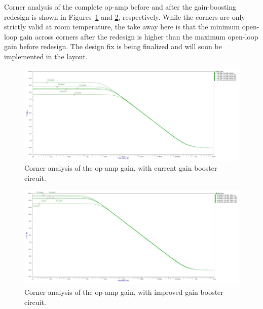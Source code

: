 Corner analysis of the complete op-amp before and after the gain-boosting redesign is shown in Figures~\ref{fig:opamp_gain_rt} and \ref{fig:opamp_gain_m_rt}, respectively. While the corners are only strictly valid at room temperature, the take away here is that the minimum open-loop gain across corners after the redesign is higher than the maximum open-loop gain before redesign. The design fix is being finalized and will soon be implemented in the layout.

\begin{figure}[h!]
\centering
  \includegraphics[width=0.8\linewidth]{figures/prakash_fig/opamp_gain_rt.JPG}
  \caption{Corner analysis of the op-amp gain, with current gain booster circuit.}
  \label{fig:opamp_gain_rt}
\end{figure}

\begin{figure}[h!]
\centering
  \includegraphics[width=0.8\linewidth]{figures/prakash_fig/opamp_gain_m_rt.JPG}
  \caption{Corner analysis of the op-amp gain, with improved gain booster circuit.}
  \label{fig:opamp_gain_m_rt}
\end{figure}

